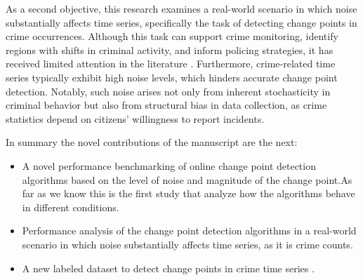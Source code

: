 \documentclass[journal,article,submit,pdftex,moreauthors]{Definitions/mdpi}
\begin{document}
As a second objective, this research examines a real-world scenario in which noise substantially affects time series, specifically the task of detecting change points in crime occurrences. Although this task can support crime monitoring, identify regions with shifts in criminal activity, and inform policing strategies, it has received limited attention in the literature \cite{konstantinou2023trend}. Furthermore, crime-related time series typically exhibit high noise levels, which hinders accurate change point detection. Notably, such noise arises not only from inherent stochasticity in criminal behavior but also from structural bias in data collection, as crime statistics depend on citizens’ willingness to report incidents.

In summary the novel contributions of the manuscript are the next:
\begin{itemize}
    \item A novel performance benchmarking of  online change point detection algorithms based on the level of noise and magnitude of the change point.As far as we know this is the first study that analyze how the algorithms behave in different conditions.
    \item Performance analysis of the change point detection algorithms in a 
    real-world scenario in which noise substantially affects time series, as it is crime counts.
    \item A new labeled dataset to detect change points in crime time series .
\end{itemize}
\end{document}
